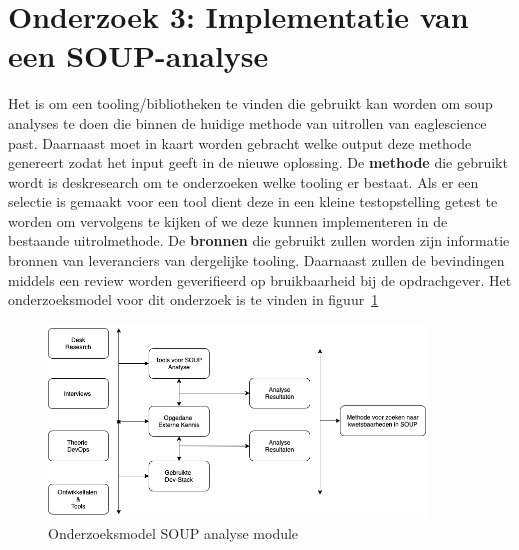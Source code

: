 \newpage %
\section{Onderzoek 3: Implementatie van een SOUP-analyse}\label{sec:onderzoek-naar-soup-analyse}
Het  is om een tooling/bibliotheken te vinden die gebruikt kan worden om soup analyses te doen die binnen de huidige methode van uitrollen van eaglescience past. Daarnaast moet in kaart worden gebracht welke output deze methode genereert zodat het input geeft in de nieuwe oplossing. De \textbf{methode} die gebruikt wordt is deskresearch om te onderzoeken welke tooling er bestaat. Als er een selectie is gemaakt voor een tool dient deze in een kleine testopstelling getest te worden om vervolgens te kijken of we deze kunnen implementeren in de bestaande uitrolmethode. De \textbf{bronnen} die gebruikt zullen worden zijn informatie bronnen van leveranciers van dergelijke tooling. Daarnaast zullen de bevindingen middels een review worden geverifieerd op bruikbaarheid bij de opdrachgever. Het onderzoeksmodel voor dit onderzoek is te vinden in figuur~\ref{fig:OnderzoeksModelSOUPAnalyse}

\begin{figure}[htbp] %
    \myfloatalign
    \includegraphics[width=10cm]{gfx/OnderzoeksmodelSOUP}
    \caption{Onderzoeksmodel SOUP analyse module}
    \label{fig:OnderzoeksModelSOUPAnalyse}
\end{figure}
